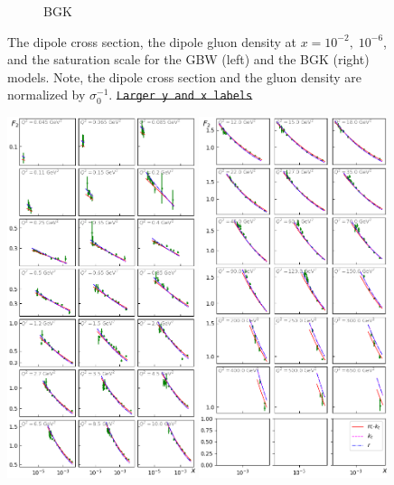 \documentclass[11pt]{article}
\numberwithin{equation}{section}
\numberwithin{table}{section}
\numberwithin{figure}{section}
\newcommand{\comment}[1]{\texttt{\color{red}#1}}
\begin{document}
\begin{figure}[p]
\begin{multicols}{2}
\begin{subfigure}{0.5\textwidth}
    \caption{BGK}
    \label{fig:BGK}
\end{subfigure}
  \end{multicols}
  \caption{The dipole cross section, the dipole gluon density at $x=10^{-2},\;
  10^{-6}$, and the saturation scale for the GBW (left) and the BGK (right)
  models. Note, the dipole cross section and the gluon density are normalized by
  $\sigma_0^{-1}$. \sout{\comment{Larger y and x labels}}} 
\label{fig:GBW-BGK}
\end{figure}

\begin{figure}[p]
\includegraphics[width=0.49\textwidth]{./plots/Figure_1.png}
\includegraphics[width=0.49\textwidth]{./plots/Figure_2.png}

\end{figure}
\end{document}
